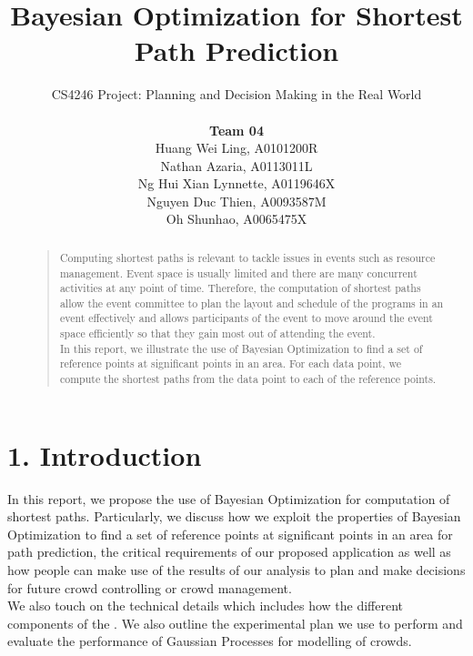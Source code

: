 \documentclass[letterpaper]{article}
\begin{document}
%
\title{Bayesian Optimization for Shortest Path Prediction}
\author{CS4246 Project: Planning and Decision Making in the Real World  \\ \\
{\bf Team 04} \\
Huang Wei Ling, A0101200R\\
Nathan Azaria, A0113011L\\
Ng Hui Xian Lynnette, A0119646X\\
Nguyen Duc Thien, A0093587M\\
Oh Shunhao, A0065475X\\
}
\maketitle
\begin{abstract}
\begin{quote}
Computing shortest paths is relevant to tackle issues in events such as resource management. Event space is usually limited and there are many concurrent activities at any point of time. Therefore, the computation of shortest paths allow the event committee to plan the layout and schedule of the programs in an event effectively and allows participants of the event to move around the event space efficiently so that they gain most out of attending the event. \\

In this report, we illustrate the use of Bayesian Optimization to find a set of reference points at significant points in an area. For each data point, we compute the shortest paths from the data point to each of the reference points.
\end{quote}
\end{abstract}

\section{1.  Introduction}
In this report, we propose the use of Bayesian Optimization for computation of shortest paths. Particularly, we discuss how we exploit the properties of Bayesian Optimization to find a set of reference points at significant points in an area for path prediction, the critical requirements of our proposed application as well as how people can make use of the results of our analysis to plan and make decisions for future crowd controlling or crowd management. \\

We also touch on the technical details which includes how the different components of the . We also outline the experimental plan we use to perform and evaluate the performance of Gaussian Processes for modelling of crowds. \\
\end{document}
